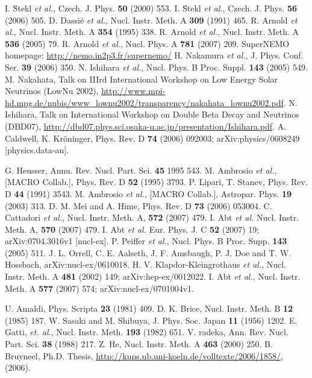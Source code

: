 \begin{thebibliography}{99}
I. \u{S}tekl \textit{et al.}, Czech. J. Phys. \textbf{50} (2000) 553.
I. \u{S}tekl \textit{et al.}, Czech. J. Phys. \textbf{56} (2006) 505.
D. Dassi\'{e} \textit{et al.}, Nucl. Instr. Meth. A \textbf{309} (1991) 465.
R. Arnold \textit{et al.}, Nucl. Instr. Meth. A \textbf{354} (1995) 338.
R. Arnold \textit{et al.}, Nucl. Instr. Meth. A \textbf{536} (2005) 79.
R. Arnold \textit{et al.}, Nucl. Phys. A \textbf{781} (2007) 209.
SuperNEMO homepage: \url{http://nemo.in2p3.fr/supernemo/}
H. Nakamura \textit{et al.}, J. Phys. Conf. Ser. \textbf{39} (2006) 350.
N. Ishihara \textit{et al.}, Nucl. Phys. B Proc. Suppl. \textbf{143} (2005) 549.
M. Nakahata, Talk on IIIrd International Workshop on Low Energy Solar Neutrinos (LowNu 2002), \url{http://www.mpi-hd.mpg.de/nubis/www_lownu2002/transparency/nakahata_lownu2002.pdf}. 
N. Ishihara, Talk on International Workshop on Double Beta Decay and Neutrinos (DBD07), \url{http://dbd07.phys.sci.osaka-u.ac.jp/presentation/Ishihara.pdf}.
A. Caldwell, K. Kr\"oninger, Phys. Rev. D \textbf{74} (2006) 092003; arXiv:physics/0608249 [physics.data-an].

G. Heusser, Annu. Rev. Nucl. Part. Sci. \textbf{45} 1995 543.
M. Ambrosio \textit{et al.}, [MACRO Collab.], Phys. Rev. D \textbf{52} (1995) 3793.
P. Lipari, T. Stanev, Phys. Rev. D \textbf{44} (1991) 3543.
M. Ambrosio \textit{et al.}, [MACRO Collab.], Astropar. Phys. \textbf{19} (2003) 313.
D. M. Mei and A. Hime, Phys. Rev. D \textbf{73} (2006) 053004.
C. Cattadori \textit{et al.}, Nucl. Instr. Meth. A, \textbf{572} (2007) 479.
I. Abt \textit{et al.} Nucl. Instr. Meth. A, \textbf{570} (2007) 479.
I. Abt \textit{et al.}  Eur. Phys. J. C \textbf{52}   (2007) 19; arXiv:0704.3016v1 [nucl-ex].
P. Peiffer \textit{et al.}, Nucl. Phys. B   Proc. Supp. \textbf{143} (2005) 511.
J. L. Orrell, C. E. Aalseth, J. F. Amsbaugh, P. J. Doe and T. W. Hossbach, arXiv:nucl-ex/0610018.
H. V. Klapdor-Kleingrothaus \textit{et al.},   Nucl. Instr. Meth. A \textbf{481} (2002) 149; arXiv:hep-ex/0012022.
I. Abt \textit{et al.}, Nucl. Instr. Meth. A \textbf{577} (2007) 574; arXiv:nucl-ex/0701004v1.

U. Amaldi, Phys. Scripta \textbf{23} (1981) 409.
D. K. Brice, Nucl. Instr. Meth. B \textbf{12} (1985) 187.
W. Sasaki and M. Shibuya, J. Phys. Soc. Japan \textbf{11} (1956) 1202.
E. Gatti, \textit{et. al.}, Nucl. Instr. Meth. \textbf{193} (1982) 651.
V. radeka, Ann. Rev. Nucl. Part. Sci. \textbf{38} (1988) 217.
Z. He, Nucl. Instr. Meth. A \textbf{463} (2000) 250.
B. Bruyneel, Ph.D. Thesis, \url{http://kups.ub.uni-koeln.de/volltexte/2006/1858/}, (2006).%


\end{thebibliography}
